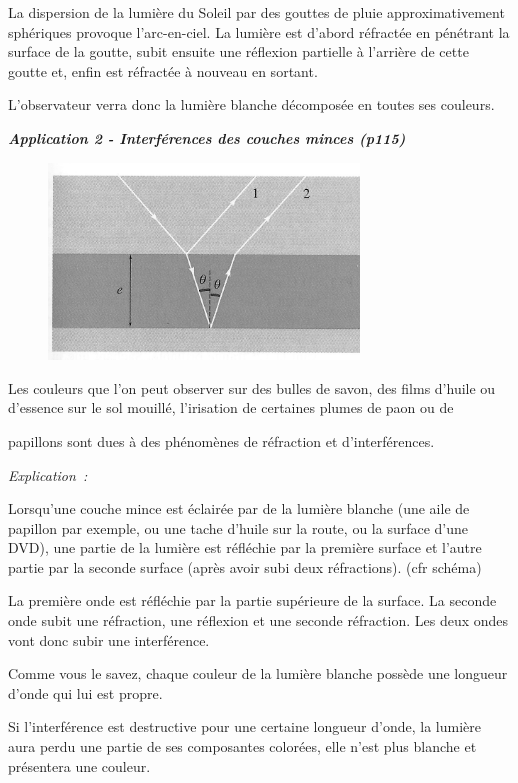 La dispersion de la lumière du Soleil par des gouttes de pluie
approximativement sphériques provoque l'arc-en-ciel. La lumière est
d'abord réfractée en pénétrant la surface de la goutte, subit ensuite
une réflexion partielle à l'arrière de cette goutte et, enfin est
réfractée à nouveau en sortant.

L'observateur verra donc la lumière blanche décomposée en toutes ses
couleurs.

\emph{\textbf{Application 2 - Interférences des couches minces (p115)}}

\begin{figure}
\centering
\includegraphics[width=8.266cm,height=5.228cm]{Pictures/10000000000003700000022E63EEBD01CC1425A1.png}
\caption{}
\end{figure}

Les couleurs que l'on peut observer sur des bulles de savon, des films
d'huile ou d'essence sur le sol mouillé, l'irisation de certaines plumes
de paon ou de

papillons sont dues à des phénomènes de réfraction et d'interférences.

\emph{Explication~: }

Lorsqu'une couche mince est éclairée par de la lumière blanche (une aile
de papillon par exemple, ou une tache d'huile sur la route, ou la
surface d'une DVD), une partie de la lumière est réfléchie par la
première surface et l'autre partie par la seconde surface (après avoir
subi deux réfractions). (cfr schéma)

La première onde est réfléchie par la partie supérieure de la surface.
La seconde onde subit une réfraction, une réflexion et une seconde
réfraction. Les deux ondes vont donc subir une interférence.

Comme vous le savez, chaque couleur de la lumière blanche possède une
longueur d'onde qui lui est propre.

Si l'interférence est destructive pour une certaine longueur d'onde, la
lumière aura perdu une partie de ses composantes colorées, elle n'est
plus blanche et présentera une couleur.

